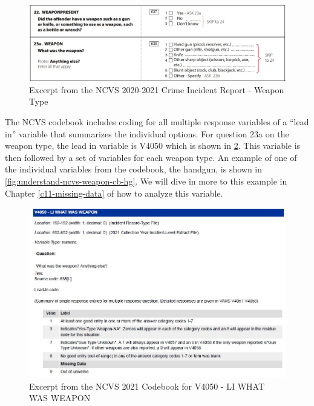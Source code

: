 \documentclass[
]{krantz}
\begin{document}
\begin{figure}
\includegraphics{images/questionnaire-ncvs-weapon} \caption{Excerpt from the NCVS 2020-2021 Crime Incident Report - Weapon Type}\label{fig:understand-ncvs-weapon-q}
\end{figure}

The NCVS codebook includes coding for all multiple response variables of a ``lead in'' variable that summarizes the individual options. For question 23a on the weapon type, the lead in variable is V4050 which is shown in \ref{fig:understand-ncvs-weapon-cb}. This variable is then followed by a set of variables for each weapon type. An example of one of the individual variables from the codebook, the handgun, is shown in \ref{fig:understand-ncvs-weapon-cb-hg}. We will dive in more to this example in Chapter \ref{c11-missing-data} of how to analyze this variable.

\begin{figure}
\includegraphics{images/codebook-ncvs-weapon-li} \caption{Excerpt from the NCVS 2021 Codebook for V4050 - LI WHAT WAS WEAPON}\label{fig:understand-ncvs-weapon-cb}
\end{figure}
\end{document}
